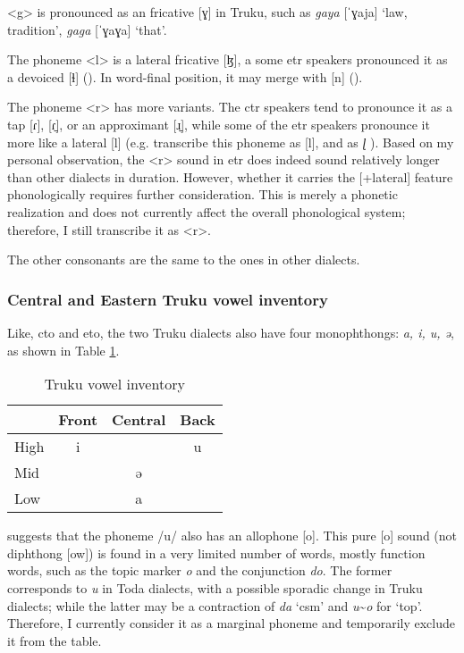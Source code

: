 <g> is pronounced as an fricative [ɣ] in Truku, such as \textit{gaya} [ˈɣaja] `law, tradition', \textit{gaga} [ˈɣaɣa] `that'.

The phoneme <l> is a lateral fricative [ɮ], a some \acl{etr} speakers pronounced it as a devoiced [ɬ] (\cite[16]{Lee2018Trugrammar}). In word-final position, it may merge with [n] (\cite[16,23]{Lee2018Trugrammar}). 

The phoneme <r> has more variants. The \acl{ctr} speakers tend to pronounce it as a tap [ɾ], [ɾ̠], or an approximant [ɹ̠], while some of the \acl{etr} speakers pronounce it more like a lateral [l] (e.g. \textcite{Chengetal2017Truku} transcribe this phoneme as [l], and \textcite{ogawaandasai1935} as \textit{ɭ} ). Based on my personal observation, the <r> sound in \acl{etr} does indeed sound relatively longer than other dialects in duration. However, whether it carries the [+lateral] feature phonologically requires further consideration. This is merely a phonetic realization and does not currently affect the overall phonological system; therefore, I still transcribe it as <r>.

The other consonants are the same to the ones in other dialects. 

\subsubsection{Central and Eastern Truku vowel inventory}

Like, \acl{cto} and \acl{eto}, the two Truku dialects also have four monophthongs: \textit{a, i, u, ə}, as shown in Table \ref{tab:trV}. 

\begin{table}[!htbp]
\centering
\caption{Truku vowel inventory}
\label{tab:trV}
\begin{tabular}{lccc}
\hline
     & Front & Central & Back \\ \hline
High &  i    &         &  u   \\
Mid  &       &  ə      &      \\
Low  &       &  a      &      \\ \hline
\end{tabular}
\end{table}

\textcite[12]{Lee2018Trugrammar} suggests that the phoneme /u/ also has an allophone [o]. This pure [o] sound (not diphthong [ow]) is found in a very limited number of words, mostly function words, such as the topic marker \textit{o} and the conjunction \textit{do}. The former corresponds to \textit{u} in Toda dialects, with a possible sporadic change in Truku dialects; while the latter may be a contraction of \textit{da} `\acs{csm}' and \textit{u}\~{}\textit{o} for `\acs{top}'. Therefore, I currently consider it as a marginal phoneme and temporarily exclude it from the table.

